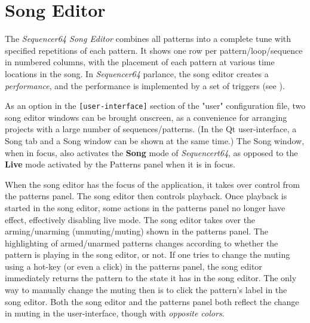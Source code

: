%
%
%

\section{Song Editor}
\label{sec:seq64_song_editor}

   The \textsl{Sequencer64 Song Editor} combines all patterns
   into a complete tune with specified repetitions of each pattern.
   It shows one row per pattern/loop/sequence in numbered columns,
   with the placement of each pattern at various time locations in the song.
   In \textsl{Sequencer64} parlance, the song editor creates a
   \textsl{performance}, and the performance is implemented by a set of
   triggers (see ).

   As an option in the \texttt{[user-interface]}
   section of the "user" configuration file, two song editor windows can be
   brought onscreen, as a convenience for arranging projects with a large
   number of sequences/patterns.
   (In the Qt user-interface, a Song tab and a Song window can be shown at the
   same time.)
   The Song window, when in focus, also activates
   the \textbf{Song} mode of \textsl{Sequencert64},
   as opposed to the \textbf{Live} mode activated by the Patterns panel when it
   is in focus.

   When the song editor has the focus of the application, it
   takes over control from the patterns panel.  The song editor then
   controls playback.
   Once playback is started in the song editor, some actions
   in the patterns panel no longer have effect, effectively disabling live
   mode.  The song editor takes over the arming/unarming (unmuting/muting)
   shown in the patterns panel.  The highlighting of armed/unarmed patterns
   changes according to whether the pattern is playing in the song editor, or
   not.  If one tries to change the muting using a hot-key (or even a click) in
   the patterns panel, the song editor immediately returns the pattern to the
   state it has in the song editor.  The only way to manually change the muting
   then is to click the pattern's label in the song editor.
   Both the song editor and the patterns panel both reflect the change in
   muting in the user-interface, though with \textsl{opposite colors}.

